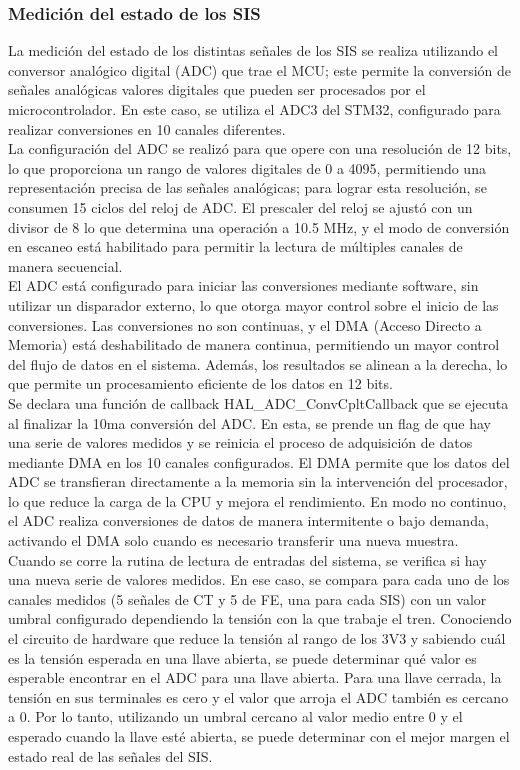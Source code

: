 \subsubsection{Medición del estado de los SIS}


La medición del estado de los distintas señales de los SIS se realiza utilizando el conversor analógico digital (ADC) que trae el MCU; este permite la conversión de señales analógicas valores digitales que pueden ser procesados por el microcontrolador. En este caso, se utiliza el ADC3 del STM32, configurado para realizar conversiones en 10 canales diferentes. \\

La configuración del ADC se realizó para que opere con una resolución de 12 bits, lo que proporciona un rango de valores digitales de 0 a 4095, permitiendo una representación precisa de las señales analógicas; para lograr esta resolución, se consumen 15 ciclos del reloj de ADC. El prescaler del reloj se ajustó con un divisor de 8 lo que determina una operación a 10.5 MHz, y el modo de conversión en escaneo está habilitado para permitir la lectura de múltiples canales de manera secuencial. \\ 

El ADC está configurado para iniciar las conversiones mediante software, sin utilizar un disparador externo, lo que otorga mayor control sobre el inicio de las conversiones. Las conversiones no son continuas, y el DMA (Acceso Directo a Memoria) está deshabilitado de manera continua, permitiendo un mayor control del flujo de datos en el sistema. Además, los resultados se alinean a la derecha, lo que permite un procesamiento eficiente de los datos en 12 bits. \\

Se declara una función de callback HAL\_ADC\_ConvCpltCallback que se ejecuta al finalizar la 10ma conversión del ADC. En esta, se prende un flag de que hay una serie de valores medidos y se reinicia el proceso de adquisición de datos mediante DMA en los 10 canales configurados. El DMA permite que los datos del ADC se transfieran directamente a la memoria sin la intervención del procesador, lo que reduce la carga de la CPU y mejora el rendimiento. En modo no continuo, el ADC realiza conversiones de datos de manera intermitente o bajo demanda, activando el DMA solo cuando es necesario transferir una nueva muestra. \\

Cuando se corre la rutina de lectura de entradas del sistema, se verifica si hay una nueva serie de valores medidos. En ese caso, se compara para cada uno de los canales medidos (5 señales de CT y 5 de FE, una para cada SIS) con un valor umbral configurado dependiendo la tensión con la que trabaje el tren. Conociendo el circuito de hardware que reduce la tensión al rango de los 3V3 y sabiendo cuál es la tensión esperada en una llave abierta, se puede determinar qué valor es esperable encontrar en el ADC para una llave abierta. Para una llave cerrada, la tensión en sus terminales es cero y el valor que arroja el ADC también es cercano a 0. Por lo tanto, utilizando un umbral cercano al valor medio entre 0 y el esperado cuando la llave esté abierta, se puede determinar con el mejor margen el estado real de las señales del SIS. 